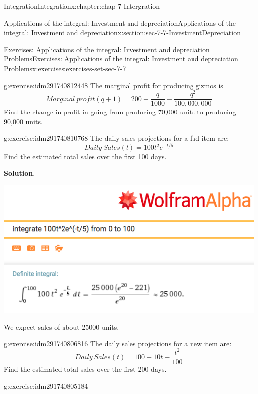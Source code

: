 \documentclass[oneside,10pt,]{book}
\numberwithin{equation}{section}
\begin{document}
\begin{chapterptx}{Integration}{}{Integration}{}{}{x:chapter:chap-7-Intergration}
\begin{sectionptx}{Applications of the integral: Investment and depreciation}{}{Applications of the integral: Investment and depreciation}{}{}{x:section:sec-7-7-InvestmentDepreciation}
\begin{exercises-subsection}{Exercises: Applications of the integral: Investment and depreciation Problems}{}{Exercises: Applications of the integral: Investment and depreciation Problems}{}{}{x:exercises:exercises-set-sec-7-7}
\begin{divisionexercise}{2}{}{}{g:exercise:idm291740812448}%
The marginal profit for producing gizmos is%
%
\begin{equation*}
Marginal\ profit(q+1)=200-\frac{q}{1000}-\frac{q^2}{100,000,000}
\end{equation*}
Find the change in profit in going from producing 70,000 units to producing 90,000 units.%
\end{divisionexercise}%
\begin{divisionexercise}{3}{}{}{g:exercise:idm291740810768}%
The daily sales projections for a fad item are:%
%
\begin{equation*}
Daily\ Sales(t)=100 t^2 e^{-t/5}
\end{equation*}
Find the estimated total sales over the first 100 days.%
\par\smallskip%
\noindent\textbf{Solution}.\hypertarget{g:solution:idm291740809280}{}\quad{}\begin{sidebyside}{1}{0.1}{0.1}{0}%
\begin{sbspanel}{0.8}%
\includegraphics[width=\linewidth]{images/sec7-7-sol3a.png}
\end{sbspanel}%
\end{sidebyside}%
\par
We expect sales of about 25000 units.%
\end{divisionexercise}%
\begin{divisionexercise}{4}{}{}{g:exercise:idm291740806816}%
The daily sales projections for a new item are:%
%
\begin{equation*}
Daily\ Sales(t)=100+10t-\frac{t^2}{100}
\end{equation*}
Find the estimated total sales over the first 200 days.%
\end{divisionexercise}%
\begin{divisionexercise}{5}{}{}{g:exercise:idm291740805184}%

\end{divisionexercise}
\end{exercises-subsection}
\end{sectionptx}
\end{chapterptx}
\end{document}
